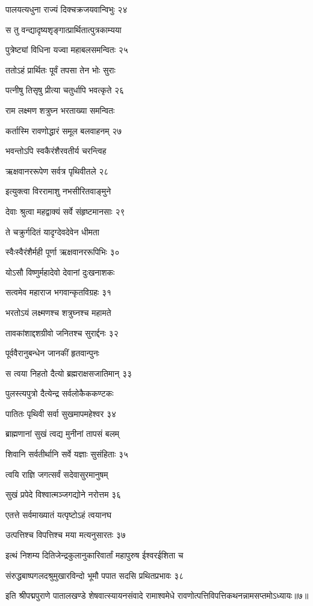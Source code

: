 पालयत्यधुना राज्यं दिक्चक्रजयवान्विभुः २४

स तु वन्द्यादृष्यशृङ्गात्प्रार्थितात्पुत्रकाम्यया

पुत्रेष्ट्यां विधिना यज्वा महाबलसमन्वितः २५

ततोऽहं प्रार्थितः पूर्वं तपसा तेन भोः सुराः

पत्नीषु तिसृषु प्रीत्या चतुर्धापि भवत्कृते २६

राम लक्ष्मण शत्रुघ्न भरताख्या समन्वितः

कर्तास्मि रावणोद्धारं समूल बलवाहनम् २७

भवन्तोऽपि स्वकैरंशैरवतीर्य चरन्त्विह

ऋक्षवानररूपेण सर्वत्र पृथिवीतले २८

इत्युक्त्वा विररामाशु नभसीरितवाङ्मुने

देवाः श्रुत्वा महद्वाक्यं सर्वे संहृष्टमानसाः २९

ते चक्रुर्गदितं यादृग्देवदेवेन धीमता

स्वैःस्वैरंशैर्मही पूर्णा ऋक्षवानररूपिभिः ३०

योऽसौ विष्णुर्महादेवो देवानां दुःखनाशकः

सत्वमेव महाराज भगवान्कृतविग्रहः ३१

भरतोऽयं लक्ष्मणश्च शत्रुघ्नश्च महामते

तावकांशाद्दशग्रीवो जनितश्च सुरार्द्दनः ३२

पूर्ववैरानुबन्धेन जानकीं हृतवान्पुनः

स त्वया निहतो दैत्यो ब्रह्मराक्षसजातिमान् ३३

पुलस्त्यपुत्रो दैत्येन्द्र सर्वलोकैककण्टकः

पातितः पृथिवी सर्वा सुखमापमहेश्वर ३४

ब्राह्मणानां सुखं त्वद्य मुनीनां तापसं बलम्

शिवानि सर्वतीर्थानि सर्वे यज्ञाः सुसंहिताः ३५

त्वयि राज्ञि जगत्सर्वं सदेवासुरमानुषम्

सुखं प्रपेदे विश्वात्मञ्जगद्योने नरोत्तम ३६

एतत्ते सर्वमाख्यातं यत्पृष्टोऽहं त्वयानघ

उत्पत्तिश्च विपत्तिश्च मया मत्यनुसारतः ३७

इत्थं निशम्य दितिजेन्द्रकुलानुकारिवार्तां महापुरुष ईश्वरईशिता च

संरुद्धबाष्पगलदश्रुमुखारविन्दो भूमौ पपात सदसि प्रथितप्रभावः ३८

इति श्रीपद्मपुराणे पातालखण्डे शेषवात्स्यायनसंवादे रामाश्वमेधे रावणोत्पत्तिविपत्तिकथनन्नामसप्तमोऽध्यायः॥७॥


